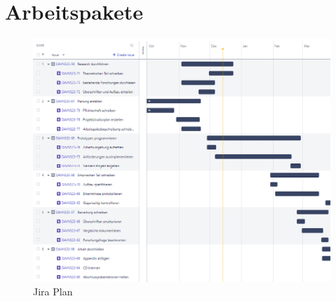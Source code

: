 \section{Arbeitspakete}
\begin{figure}[H]
    \centering
    \includegraphics[angle=270,origin=c,scale=.9]{content/img/JiraPlan.png}
    \caption{Jira Plan}
    \label{fig:jiraplan}
\end{figure}
\newpage